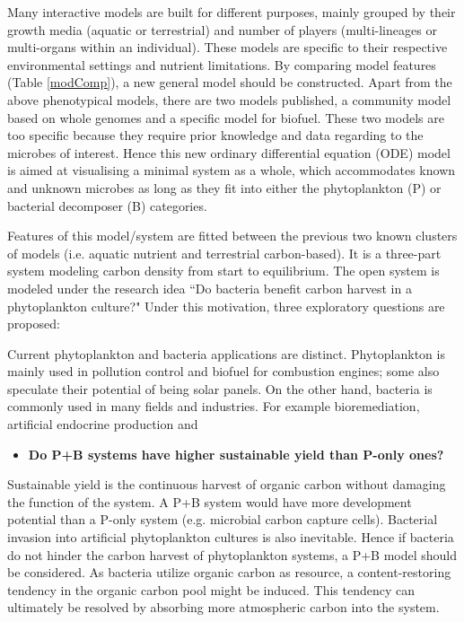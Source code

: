 \documentclass[../thesis.tex]{subfiles} %
\begin{document}
Many interactive models are built for different purposes, mainly grouped by their growth media (aquatic or terrestrial) and number of players (multi-lineages or multi-organs within an individual).  These models are specific to their respective environmental settings and nutrient limitations.  By comparing model features (Table \ref{modComp}), a new general model should be constructed.  Apart from the above phenotypical models, there are two models published, a community model based on whole genomes\autocite{harcombe2014metabolic} and a specific model for biofuel\autocite{kirthiga2014mathematical}.  These two models are too specific because they require prior knowledge and data regarding to the microbes of interest.  Hence this new ordinary differential equation (ODE) model is aimed at visualising a minimal system as a whole, which accommodates known and unknown microbes as long as they fit into either the phytoplankton (P) or bacterial decomposer (B) categories.

Features of this model/system are fitted between the previous two known clusters of models (i.e. aquatic nutrient and terrestrial carbon-based).  It is a three-part system modeling carbon density from start to equilibrium.  The open system is modeled under the research idea ``Do bacteria benefit carbon harvest in a phytoplankton culture?"  Under this motivation, three exploratory questions are proposed:

Current phytoplankton and bacteria applications are distinct.  Phytoplankton is mainly used in pollution control\autocite{evanson_2019,mcginn2011integration,rawat2011dual} and biofuel for combustion engines\autocite{mcginn2011integration,rawat2011dual}; some also speculate their potential of being solar panels.\autocite{sawa2017electricity,joshi2018bacterial}  On the other hand, bacteria is commonly used in many fields and industries.  For example bioremediation, artificial endocrine production and 

\begin{itemize}
    \item \textbf{
    Do P+B systems have higher sustainable yield than P-only ones?
    }
\end{itemize}

Sustainable yield is the continuous harvest of organic carbon without damaging the function of the system.  
A P+B system would have more development potential than a P-only system (e.g. microbial carbon capture cells).  Bacterial invasion into artificial phytoplankton cultures is also inevitable.  Hence if bacteria do not hinder the carbon harvest of phytoplankton systems, a P+B model should be considered.  As bacteria utilize organic carbon as resource, a content-restoring tendency in the organic carbon pool might be induced.  This tendency can ultimately be resolved by absorbing more atmospheric carbon into the system.
\end{document}
